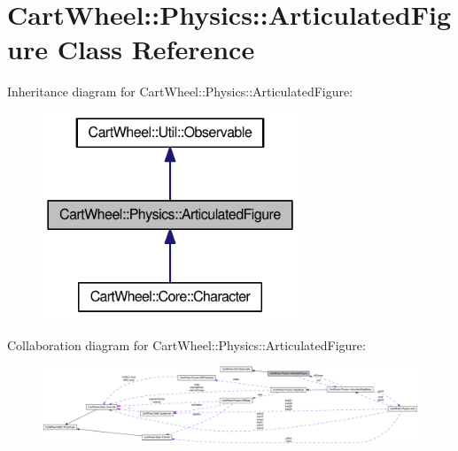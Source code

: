 \hypertarget{classCartWheel_1_1Physics_1_1ArticulatedFigure}{
\section{CartWheel::Physics::ArticulatedFigure Class Reference}
\label{classCartWheel_1_1Physics_1_1ArticulatedFigure}
}


Inheritance diagram for CartWheel::Physics::ArticulatedFigure:\nopagebreak
\begin{figure}[H]
\begin{center}
\leavevmode
\includegraphics[width=216pt]{classCartWheel_1_1Physics_1_1ArticulatedFigure__inherit__graph}
\end{center}
\end{figure}


Collaboration diagram for CartWheel::Physics::ArticulatedFigure:\nopagebreak
\begin{figure}[H]
\begin{center}
\leavevmode
\includegraphics[width=400pt]{classCartWheel_1_1Physics_1_1ArticulatedFigure__coll__graph}
\end{center}
\end{figure}
